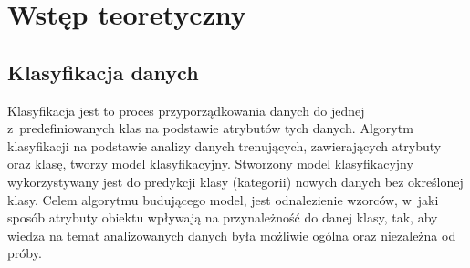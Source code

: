 \chapter{Wstęp teoretyczny}
\section{Klasyfikacja danych}

Klasyfikacja jest to proces przyporządkowania danych do jednej z predefiniowanych klas na podstawie atrybutów tych danych. Algorytm klasyfikacji na podstawie analizy danych trenujących, zawierających atrybuty oraz klasę, tworzy model klasyfikacyjny. Stworzony model klasyfikacyjny wykorzystywany jest do predykcji klasy (kategorii) nowych danych bez określonej klasy. Celem algorytmu budującego model, jest  odnalezienie wzorców, w jaki sposób atrybuty obiektu wpływają na przynależność do danej klasy, tak, aby wiedza na temat analizowanych danych była możliwie ogólna oraz niezależna od próby.

